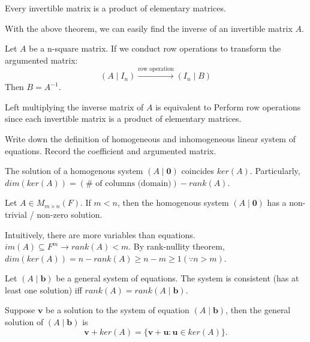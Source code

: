 \documentclass[12pt]{article}
\begin{document}
\begin{theorem}
    Every invertible matrix is a product of elementary matrices.
\end{theorem}

With the above theorem, we can easily find the inverse of an invertible matrix $A$.
\begin{theorem}
    Let $A$ be a n-square matrix. If we conduct row operations to transform the argumented matrix:
    \[(A\mid I_n)\xrightarrow{\text{row operation}}(I_n\mid B)\]
    Then $B=A^{-1}$.
\end{theorem}

\begin{pf}
    Left multiplying the inverse matrix of $A$ is equivalent to Perform row operations since each invertible matrix is a product of elementary matrices.
\end{pf}


\begin{exercise}
    Write down the definition of homogeneous and inhomogeneous linear system of equations. Record the coefficient and argumented matrix.
\end{exercise}

\begin{theorem}
    The solution of a homogenous system $(A\mid \mathbf{0})$ coincides $ker(A)$.
    Particularly, $dim(ker(A))=(\#\text{ of columns (domain)}) - rank(A).$
\end{theorem}

\begin{theorem}
    Let $A\in M_{m\times n}(F)$. If $m<n$, then the homogenous system $(A\mid \mathbf{0})$ has a non-trivial / non-zero solution.
\end{theorem}

\begin{pf}
    Intuitively, there are more variables than equations. \\
    $im(A)\subseteq F^m\rightarrow rank(A)<m$. By rank-nullity theorem, $dim(ker(A))=n-rank(A)\geq n-m\geq 1 (\because n>m)$.
\end{pf}


\begin{theorem}
    Let $(A\mid\mathbf{b})$ be a general system of equations.
    The system is consistent (has at least one solution) iff $rank(A)=rank(A\mid \mathbf{b})$.
\end{theorem}

\begin{theorem}
Suppose $\mathbf{v}$ be a solution to the system of equation $(A\mid\mathbf{b})$,
then the general solution of $(A\mid\mathbf{b})$ is
\[\mathbf{v}+ker(A)=\{\mathbf{v}+\mathbf{u}:\mathbf{u}\in ker(A)\}.\]
\end{theorem}
\end{document}

